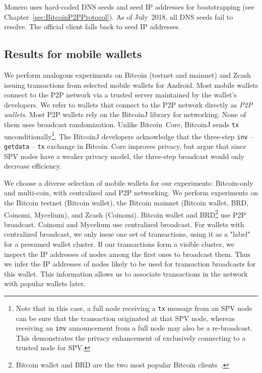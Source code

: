 Monero uses hard-coded DNS seeds and seed IP addresses for bootstrapping (see Chapter~\ref{sec:BitcoinP2PProtocol}).
As of July~2018, all DNS seeds fail to resolve.
The official client falls back to seed IP addresses.


\subsection{Results for mobile wallets}

We perform analogous experiments on Bitcoin (testnet and mainnet) and Zcash issuing transactions from selected mobile wallets for Android.
Most mobile wallets connect to the P2P network via a trusted server maintained by the wallet's developers.
We refer to wallets that connect to the P2P network directly as \textit{P2P wallets}.
Most P2P wallets rely on the BitcoinJ library for networking.
None of them uses broadcast randomization.
Unlike Bitcoin~Core, BitcoinJ sends \texttt{tx} unconditionally\footnote{Note that in this case, a full node receiving a \texttt{tx} message from an SPV node can be sure that the transaction originated at that SPV node, whereas receiving an \texttt{inv} announcement from a full node may also be a re-broadcast. This demonstrates the privacy enhancement of exclusively connecting to a trusted node for SPV.}.
The BitcoinJ developers acknowledge that the three-step \texttt{inv} -- \texttt{getdata} -- \texttt{tx} exchange in Bitcoin~Core improves privacy, but argue that since SPV nodes have a weaker privacy model, the three-step broadcast would only decrease efficiency.

We choose a diverse selection of mobile wallets for our experiments: Bitcoin-only and multi-coin, with centralized and P2P networking.
We perform experiments on the Bitcoin testnet (Bitcoin wallet), the Bitcoin mainnet (Bitcoin wallet, BRD, Coinomi, Mycelium), and Zcash (Coinomi).
Bitcoin wallet and BRD\footnote{Bitcoin wallet and BRD are the two most popular Bitcoin clients~\cite{Wang2017}.} use P2P broadcast.
Coinomi and Mycelium use centralized broadcast.
For wallets with centralized broadcast, we only issue one set of transactions, using it as a "label" for a presumed wallet cluster.
If our transactions form a visible cluster, we inspect the IP addresses of nodes among the first ones to broadcast them.
Thus we infer the IP addresses of nodes likely to be used for transaction broadcasts for this wallet.
This information allows us to associate transactions in the network with popular wallets later.

